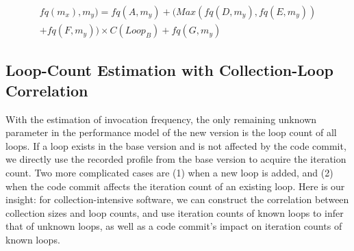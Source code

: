 

   
\begin{multline}
\label{equa:example}
fq(m_x), m_y)=fq(A, m_y) + (Max(fq(D, m_y), fq(E, m_y))\\ + fq(F, m_y)) \times C(Loop_B) + fq(G, m_y)
\end{multline}
\vspace{-0.5cm}



 

\subsection{Loop-Count Estimation with Collection-Loop Correlation} 

With the estimation of invocation frequency, the only remaining unknown parameter in the performance model of the new version is the loop count of all loops. If a loop exists in the base version and is not affected by the code commit, we directly use the recorded profile from the base version to acquire the iteration count. Two more complicated cases are (1) when a new loop is added, and (2) when the code commit affects the iteration count of an existing loop. Here is our insight: for collection-intensive software, we can construct the correlation between collection sizes and loop counts, and use iteration counts of known loops to infer that of unknown loops, as well as a code commit's impact on iteration counts of known loops. 

